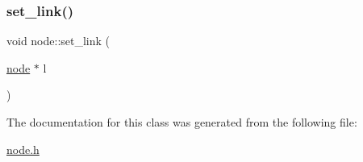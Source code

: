 \hypertarget{classnode_ae9887204ac73c954e3a4da3fa15c9df9}{}\label{classnode_ae9887204ac73c954e3a4da3fa15c9df9} 
\subsubsection{\texorpdfstring{set\+\_\+link()}{set\_link()}}
{\footnotesize\ttfamily void node\+::set\+\_\+link (\begin{DoxyParamCaption}\item[{\hyperlink{classnode}{node} $\ast$}]{l }\end{DoxyParamCaption})\hspace{0.3cm}{\ttfamily [inline]}}



The documentation for this class was generated from the following file\+:\begin{DoxyCompactItemize}
\item 
\hyperlink{node_8h}{node.\+h}\end{DoxyCompactItemize}
